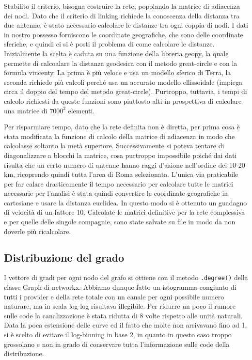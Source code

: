 Stabilito il criterio, bisogna costruire la rete, popolando la matrice di adiacenza dei nodi. Dato che il criterio di linking richiede la conoscenza della distanza tra due antenne, è stato necessario calcolare le distanze tra ogni coppia di nodi. I dati in nostro possesso forniscono le coordinate geografiche, che sono delle coordinate sferiche, e quindi ci si è posti il problema di come calcolare le distanze. Inizialmente la scelta è caduta su una funzione della libreria geopy, la quale permette di calcoalare la distanza geodesica con il metodo great-circle e con la formula vincenty. La prima è più veloce e usa un modello sferico di Terra, la seconda richiede più calcoli perché usa un accurato modello ellissoidale (impiega circa il doppio del tempo del metodo great-circle). Purtroppo, tuttavia, i tempi di calcolo richiesti da queste funzioni sono piuttosto alti in prospettiva di calcolare una matrice di $7000^2$ elementi. 

Per risparmiare tempo, dato che la rete definita non è diretta, per prima cosa è stata modificata la funzione di calcolo della matrice di adiacenza in modo che calcolasse soltanto la metà superiore. Successivamente si poteva tentare di diagonalizzare a blocchi la matrice, cosa purtroppo impossibile poiché dai dati risulta che un certo numero di antenne hanno raggi d'azione nell'ordine dei 10-20 km, ricoprendo quindi tutta l'area di Roma selezionata. L'unica via praticabile per far calare drasticamente il tempo necessario per calcolare tutte le matrici necessarie per l'analisi è stata quindi convertire le coordinate geografiche in cartesiane e usare la distanza euclidea. In questo modo si è ottenuto un guadagno di velocità di un fattore 10. Calcolate le matrici definitive per la rete complessiva e per quelle delle singole compagnie, sono state salvate su file in modo da non doverle più ricalcolare.


\subsection{Distribuzione del grado}
I vettore di gradi per ogni nodo del grafo si ottiene con il metodo \lstinline{.degree()} della classe Graph di networkx. Abbiamo dunque fatto un istogramma congiunto di tutti i provider e della rete totale con un canale per ogni possibile numero naturare, ma in scala log-log risultava illegibile. Per ridurre un poco il rumore sulle code la canalizzazione è stata ridutta di 8 volte rispetto alle unità naturali. Data la poca estensione delle curve ed il fatto che molte non arrivavano fino ad 1, si è scelto di evitare il log-binning in base 2, in quanto in questo caso troppo grossolano e non in grado di conservare tutta l'informazione sulle code della distribuzione.

